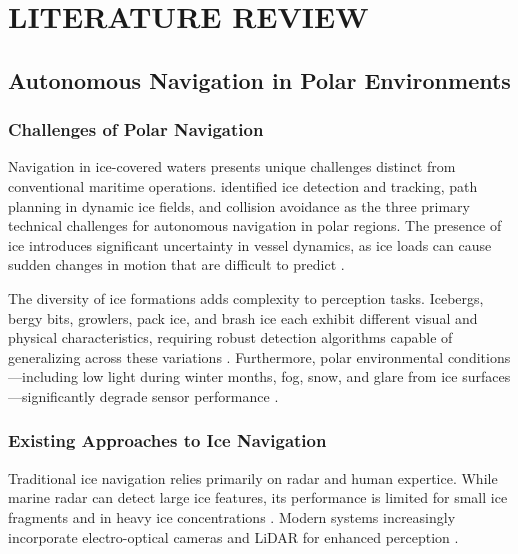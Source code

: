 \clearpage
\section{LITERATURE REVIEW}

\subsection{Autonomous Navigation in Polar Environments}

\subsubsection{Challenges of Polar Navigation}

Navigation in ice-covered waters presents unique challenges distinct from conventional maritime operations. \citeauthor{fu2018review} identified ice detection and tracking, path planning in dynamic ice fields, and collision avoidance as the three primary technical challenges for autonomous navigation in polar regions. The presence of ice introduces significant uncertainty in vessel dynamics, as ice loads can cause sudden changes in motion that are difficult to predict \parencite{nguyen2019learning}.

The diversity of ice formations adds complexity to perception tasks. Icebergs, bergy bits, growlers, pack ice, and brash ice each exhibit different visual and physical characteristics, requiring robust detection algorithms capable of generalizing across these variations \parencite{mcmahon2015autonomous}. Furthermore, polar environmental conditions---including low light during winter months, fog, snow, and glare from ice surfaces---significantly degrade sensor performance \parencite{desmond2018field}.

\subsubsection{Existing Approaches to Ice Navigation}

Traditional ice navigation relies primarily on radar and human expertice. While marine radar can detect large ice features, its performance is limited for small ice fragments and in heavy ice concentrations \parencite{foley2015automated}. Modern systems increasingly incorporate electro-optical cameras and LiDAR for enhanced perception \parencite{kudriavtsev2019ice}.

